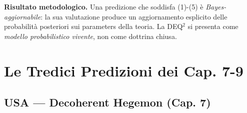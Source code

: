 \Proved{} \textbf{Risultato metodologico.} Una predizione che soddisfa
(1)-(5) è \emph{Bayes-aggiornabile}: la sua valutazione produce un
aggiornamento esplicito delle probabilità posteriori sui parameters della
teoria. La DEQ$^2$ si presenta come \emph{modello probabilistico vivente},
non come dottrina chiusa.



\section{Le Tredici Predizioni dei Cap.
7-9}\label{le-tredici-predizioni-dei-cap.-7-9}

\subsection{USA --- Decoherent Hegemon (Cap.
7)}\label{usa-egemone-decoerente-cap.-7}


